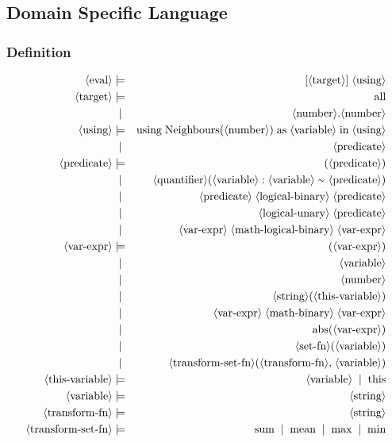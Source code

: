 \subsection{Domain Specific Language}

\subsubsection{Definition}
\begin{eqnarray*}
	\pn{eval} & \pp & [ \pn{target} ] \ww \pn{using} \\
	\pn{target} & \pp & \sm{all} \\
	~ & \oo & \pn{number}\sm{.}\pn{number} \\
%
	\pn{using} & \pp & \sm{using} \ww \sm{Neighbours}\sm{(}\pn{number}\sm{)} \ww \sm{as} \ww \pn{variable} \ww \sm{in} \ww \pn{using} \\
	~ & \oo & \pn{predicate} \\
%
	\pn{predicate} & \pp &  \sm{(}\pn{predicate}\sm{)} \\
	~ & \oo & \pn{quantifier}\sm{(}\pn{variable} \ww \sm{:} \ww \pn{variable} \ww \sm{\mytilde} \pn{predicate} \sm{)}\\
	~ & \oo &  \pn{predicate} \ww \pn{logical-binary} \ww \pn{predicate} \\
	~ & \oo &  \pn{logical-unary} \ww \pn{predicate} \\
	~ & \oo &  \pn{var-expr} \ww \pn{math-logical-binary} \ww \pn{var-expr} \\
%
	\pn{var-expr} & \pp & \sm{(}\pn{var-expr}\sm{)} \\
	~ & \oo & \pn{variable} \\
	~ & \oo & \pn{number} \\
	~ & \oo & \pn{string}\sm{(}\pn{this-variable}\sm{)} \\
	~ & \oo & \pn{var-expr} \ww \pn{math-binary} \ww \pn{var-expr} \\
	~ & \oo & \sm{abs}\sm{(}\pn{var-expr}\sm{)} \\
	~ & \oo & \pn{set-fn}\sm{(}\pn{variable}\sm{)} \\
	~ & \oo & \pn{transform-set-fn}\sm{(}\pn{transform-fn}\sm{,} \ww \pn{variable}\sm{)} \\
%
	\pn{this-variable} & \pp & \pn{variable} \oo \sm{this} \\
	\pn{variable} & \pp & \pn{string} \\
%
	\pn{transform-fn} & \pp & \pn{string} \\
	\pn{transform-set-fn} & \pp & \sm{sum} \oo  \sm{mean} \oo \sm{max} \oo \sm{min} \\

\end{eqnarray*}
